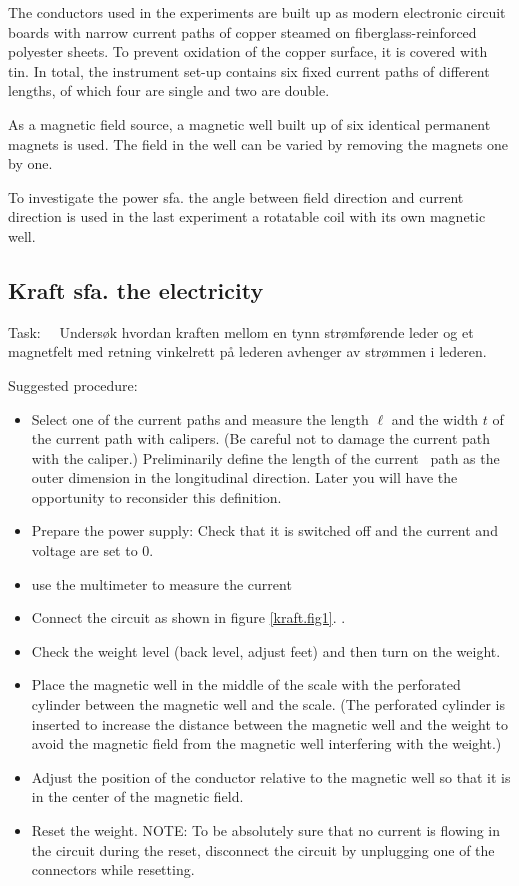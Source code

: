\documentclass[../Elmag-labhefte-2020.tex]{subfiles}
\begin{document}
The conductors used in the experiments are built up as modern electronic circuit boards with narrow current paths of copper steamed on fiberglass-reinforced polyester sheets. To prevent oxidation of the copper surface, it is covered with tin. In total, the instrument set-up contains six fixed current paths of different lengths, of which four are single and two are double.

As a magnetic field source, a magnetic well built up of six identical permanent magnets is used. The field in the well can be varied by removing the magnets one by one.

To investigate the power sfa. the angle between field direction and current direction is used in the last experiment a rotatable coil with its own magnetic well.



\subsection{Kraft sfa. the electricity}

Task: \ \
{\itsf Undersøk hvordan kraften mellom en tynn strømførende leder og et magnetfelt med retning vinkelrett på lederen avhenger av strømmen i lederen.}

Suggested procedure:
%
\vspace{-4mm}
\begin{itemize}
    \item Select one of the current paths and measure the length $\ell$ and the width $t$ of the current path with calipers. (Be careful not to damage the current path with the caliper.) Preliminarily define the length of the current \ path as the outer dimension in the longitudinal direction. %
    Later you will have the opportunity to reconsider this definition.
     
    \item Prepare the power supply: Check that it is switched off and the current and voltage are set to 0.
    \item use the multimeter to measure the current
    \item Connect the circuit as shown in figure \ref{kraft.fig1}. .
    \item Check the weight level (back level, adjust feet) and then turn on the weight.
    \item Place the magnetic well in the middle of the scale with the perforated cylinder between the magnetic well and the scale. %
    (The perforated cylinder is inserted to increase the distance between the magnetic well and the weight to avoid the magnetic field from the magnetic well interfering with the weight.)
    \item Adjust the position of the conductor relative to the magnetic well so that it is in the center of the magnetic field.
    \item Reset the weight.
    NOTE: To be absolutely sure that no current is flowing in the circuit during the reset, disconnect the circuit by unplugging one of the connectors while resetting.
    \end{itemize}
    
\end{document}
